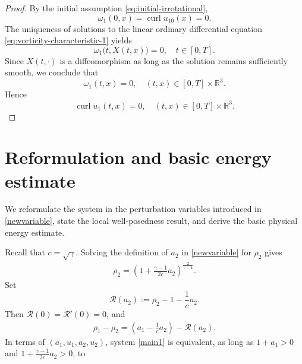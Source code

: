 \documentclass[10pt,reqno]{amsart}
\numberwithin{equation}{section}
\begin{document}
\begin{proof}
	
	By the initial assumption \eqref{eq:initial-irrotational},
\[%
		\omega_1(0,x)
		=\operatorname{curl}u_{10}(x)
		=0.
\]%
	The uniqueness of solutions to the linear ordinary differential equation \eqref{eq:vorticity-characteristic-1} yields
\[%
		\omega_1\bigl(t,X(t,x)\bigr)=0,
		\quad
		t\in[0,T].
\]%
	Since $X(t,\cdot)$ is a diffeomorphism as long as the solution
	remains sufficiently smooth, we conclude that
	$$
	\omega_1(t,x)=0,
	\quad
	(t,x)\in [0,T]\times\mathbb{R}^3.
	$$
	Hence
	$$
	\operatorname{curl} u_1(t,x)=0,
	\quad
	(t,x)\in[0,T]\times\mathbb{R}^3.
	$$
\end{proof}

%
%
%
%
%
%

\section{Reformulation and basic energy estimate}\label{S3}
We reformulate the system in the perturbation variables introduced in \eqref{newvariable}, state the local well-posedness result, and derive the basic physical energy estimate.

Recall that $c=\sqrt{\gamma}$. Solving the definition of $a_2$ in
\eqref{newvariable} for $\rho_2$ gives
\begin{align}\label{rho2-a2}
\rho_2
=\left(1+\frac{\gamma-1}{2c}a_2\right)^{\frac{2}{\gamma-1}}.
\end{align}
Set
\[
\mathcal R(a_2)
:=\rho_2-1-\frac1c a_2.
\]
Then $\mathcal R(0)=\mathcal R'(0)=0$, and
\begin{align}\label{physical-charge}
\rho_1-\rho_2
=\left(a_1-\frac1c a_2\right)-\mathcal R(a_2).
\end{align}
In terms of $(a_1,u_1,a_2,u_2)$, system \eqref{main1} is equivalent, as long as $1+a_1 > 0$ and 
$1+\frac{\gamma-1}{2c}a_2>0$, to
\end{document}
